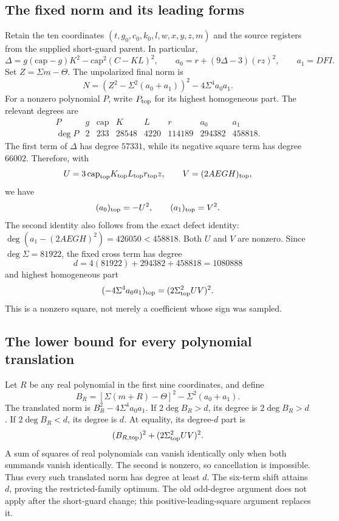 \documentclass[11pt]{article}
\begin{document}
\subsection{The fixed norm and its leading forms}
Retain the ten coordinates $(t,g_0,c_0,k_0,l,w,x,y,z,m)$ and the source
registers from the supplied short-guard parent. In particular,
\[
 \Delta=g(\mathrm{cap}-g)K^2-\mathrm{cap}^2(C-KL)^2,
 \qquad a_0=r+(9\Delta-3)(rz)^2,\qquad a_1=DFI.
\]
Set $Z=\Sigma m-\Theta$. The unpolarized final norm is
\[
 N=(Z^2-\Sigma^2(a_0+a_1))^2-4\Sigma^4a_0a_1.
\]
For a nonzero polynomial $P$, write $P_{\rm top}$ for its highest
homogeneous part. The relevant degrees are
\[
\begin{array}{c|rrrrrrr}
 P&g&\mathrm{cap}&K&L&r&a_0&a_1\\\hline
 \deg P&2&233&28548&4220&114189&294382&458818.
\end{array}
\]
The first term of $\Delta$ has degree $57331$, while its negative square
term has degree $66002$. Therefore, with
\[
 U=3\,\mathrm{cap}_{\rm top}K_{\rm top}L_{\rm top}r_{\rm top}z,
 \qquad V=(2AEGH)_{\rm top},
\]
we have
\[
 (a_0)_{\rm top}=-U^2,\qquad (a_1)_{\rm top}=V^2.
\]
The second identity also follows from the exact defect identity:
$\deg(a_1-(2AEGH)^2)=426050<458818$. Both $U$ and $V$ are nonzero.
Since $\deg\Sigma=81922$, the fixed cross term has degree
\[
 d=4(81922)+294382+458818=1080888
\]
and highest homogeneous part
\[
 (-4\Sigma^4a_0a_1)_{\rm top}=(2\Sigma_{\rm top}^{2}UV)^2.
\]
This is a nonzero square, not merely a coefficient whose sign was sampled.

\subsection{The lower bound for every polynomial translation}
Let $R$ be any real polynomial in the first nine coordinates, and define
\[
 B_R=[\Sigma(m+R)-\Theta]^2-\Sigma^2(a_0+a_1).
\]
The translated norm is $B_R^2-4\Sigma^4a_0a_1$. If
$2\deg B_R>d$, its degree is $2\deg B_R>d$. If $2\deg B_R<d$, its
degree is $d$. At equality, its degree-$d$ part is
\[
 (B_{R,\rm top})^2+(2\Sigma_{\rm top}^{2}UV)^2.
\]
A sum of squares of real polynomials can vanish identically only when
both summands vanish identically. The second is nonzero, so cancellation
is impossible. Thus every such translated norm has degree at least $d$.
The six-term shift attains $d$, proving the restricted-family optimum.
The old odd-degree argument does not apply after the short-guard change;
this positive-leading-square argument replaces it.
\end{document}
